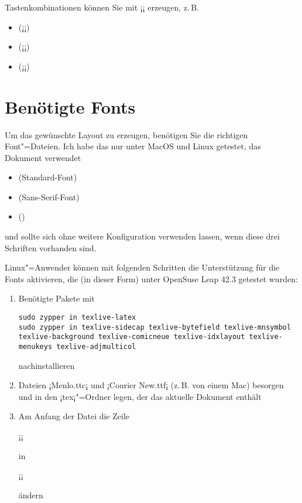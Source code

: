 Tastenkombinationen können Sie mit ¡\keys¡ erzeugen, z.\,B.

\begin{itemize}
\item {} (¡¡)
\item {} (¡¡)
\item {} (¡¡)
\end{itemize}


\section{Benötigte Fonts}

Um das gewünschte Layout zu erzeugen, benötigen Sie die richtigen Font"=Dateien. Ich habe das nur unter MacOS und Linux getestet, das Dokument verwendet

\begin{itemize}
\item {} (Standard-Font)
\item {} (\textsf{Sans-Serif-Font})
\item {} ()
\end{itemize}
%
%
%

und sollte sich ohne weitere Konfiguration verwenden lassen, wenn diese drei Schriften vorhanden sind. 

Linux"=Anwender können mit folgenden Schritten die Unterstützung für die Fonts aktivieren, die (in dieser Form) unter OpenSuse Leap 42.3 getestet wurden:

\begin{enumerate}
\item Benötigte Pakete mit
\begin{lstlisting}[breaklines=true]
sudo zypper in texlive-latex
sudo zypper in texlive-sidecap texlive-bytefield texlive-mnsymbol texlive-background texlive-comicneue texlive-idxlayout texlive-menukeys texlive-adjmulticol 
\end{lstlisting}
nachinstallieren

\item Dateien ¡Menlo.ttc¡ und ¡Courier New.ttf¡ (z.\,B.{} von einem Mac) besorgen und in den ¡tex¡"=Ordner legen, der das aktuelle Dokument enthält

\item Am Anfang der Datei die Zeile

¡\def\hasMenloFont{True}¡

in

¡\def\hasMenloFont{False}¡

ändern
\end{enumerate}




